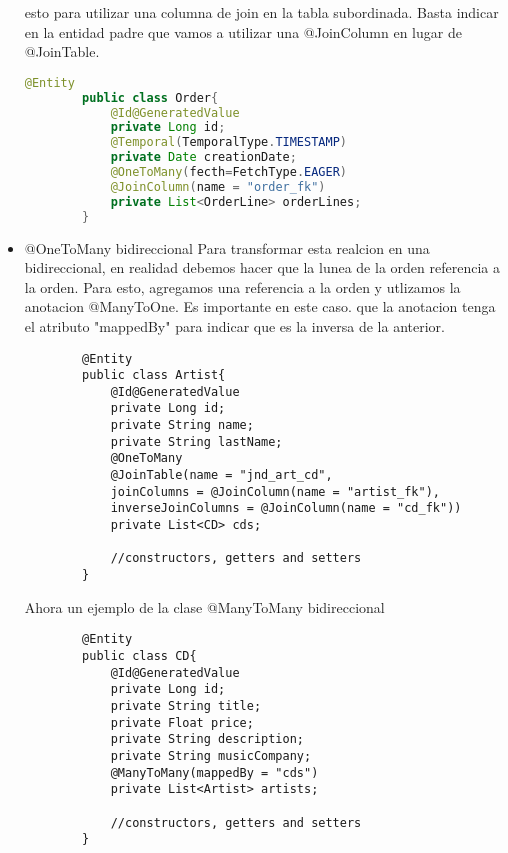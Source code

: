 \documentclass{article}
\begin{document}
\begin{itemize}
	      esto para utilizar una columna de join en la tabla subordinada. Basta indicar en la entidad padre que vamos a utilizar una
	      @JoinColumn en lugar de @JoinTable.
	      \begin{lstlisting}[language=Java]
        @Entity
        public class Order{
            @Id@GeneratedValue
            private Long id;
            @Temporal(TemporalType.TIMESTAMP)
            private Date creationDate;
            @OneToMany(fecth=FetchType.EAGER)
            @JoinColumn(name = "order_fk")
            private List<OrderLine> orderLines;
        }
        \end{lstlisting}

	\item @OneToMany bidireccional
	      \subitem Para transformar esta realcion en una bidireccional, en realidad debemos hacer que la lunea de la orden referencia a la orden.
	      Para esto, agregamos una referencia a la orden y utlizamos la anotacion @ManyToOne. Es importante en este caso. que la anotacion tenga el atributo
	      "mappedBy" para indicar que es la inversa de la anterior.
	      \begin{lstlisting}
        @Entity
        public class Artist{
            @Id@GeneratedValue
            private Long id;
            private String name;
            private String lastName;
            @OneToMany
            @JoinTable(name = "jnd_art_cd",
            joinColumns = @JoinColumn(name = "artist_fk"),
            inverseJoinColumns = @JoinColumn(name = "cd_fk"))
            private List<CD> cds;

            //constructors, getters and setters
        }
    \end{lstlisting}

	      Ahora un ejemplo de la clase @ManyToMany bidireccional
	      \begin{lstlisting}
        @Entity
        public class CD{
            @Id@GeneratedValue
            private Long id;
            private String title;
            private Float price;
            private String description;
            private String musicCompany;
            @ManyToMany(mappedBy = "cds")
            private List<Artist> artists;

            //constructors, getters and setters
        }
    \end{lstlisting}
\end{itemize}
\end{document}
